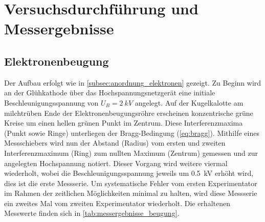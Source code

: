 \documentclass[ngerman]{scrartcl}
\begin{document}
\section{Versuchsdurchführung und Messergebnisse}
\label{sec:versuchsdurchfuehrung_messergebnisse}

\subsection{Elektronenbeugung}
\label{subsec:durchfuehrung_elektronenbeugung}

Der Aufbau erfolgt wie in \autoref{subsec:anordnung_elektronen} gezeigt. Zu Beginn wird an der Glühkathode über das Hochspannungsnetzgerät eine initiale Beschleunigungsspannung von $U_B = \SI{2}{kV}$ angelegt. Auf der Kugelkalotte am milchtrüben Ende der Elektronenbeugungsröhre erscheinen konzentrische grüne Kreise um einen hellen grünen Punkt im Zentrum. Diese Interferenzmaxima (Punkt sowie Ringe) unterliegen der Bragg-Bedingung (\autoref{eq:bragg}). Mithilfe eines Messschiebers wird nun der Abstand (Radius) vom ersten und zweiten Interferenzmaximum (Ring) zum nullten Maximum (Zentrum) gemessen und zur angelegten Hochspannung notiert. Dieser Vorgang wird weitere viermal wiederholt, wobei die Beschleunigungsspannung jeweils um \SI{0.5}{kV} erhöht wird, dies ist die erste Messserie. Um systematische Fehler vom ersten Experimentator im Rahmen der zeitlichen Möglichkeiten minimal zu halten, wird diese Messserie ein zweites Mal vom zweiten Experimentator wiederholt. Die erhaltenen Messwerte finden sich in \autoref{tab:messergebnisse_beugung}.
%
\end{document}
